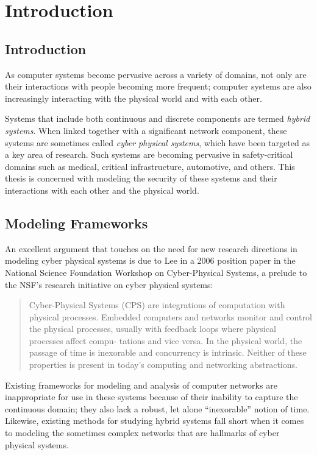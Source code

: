 \chapter{Introduction}
\section{Introduction}
As computer systems become pervasive across a variety of domains, not only are their interactions
with people becoming more frequent; computer systems are also increasingly interacting with the 
physical world and with each other.

Systems that include both continuous and discrete components are termed \emph{hybrid systems}.
When linked together with a significant network component, these systems are sometimes called
\emph{cyber physical systems}, which have been targeted as a key area of research. Such systems
are becoming pervasive in safety-critical domains such as medical, critical infrastructure, 
automotive, and others. This thesis is concerned with modeling the security of these systems and
their interactions with each other and the physical world.
\section{Modeling Frameworks}
An excellent argument that touches on the need for new research directions in modeling cyber physical systems
is due to Lee in a 2006 position paper in the National Science Foundation Workshop on Cyber-Physical Systems,
a prelude to the NSF's research initiative on cyber physical systems:
\begin{quote}
Cyber-Physical Systems (CPS) are integrations of computation with physical
processes. Embedded computers and networks monitor and control the physical
processes, usually with feedback loops where physical processes affect compu-
tations and vice versa. In the physical world, the passage of time is inexorable
and concurrency is intrinsic. Neither of these properties is present in today's
computing and networking abstractions. ~\cite{lee2006cyber}
\end{quote}

Existing frameworks for modeling and analysis of computer networks are inappropriate for use in
these systems because of their inability to capture the continuous domain; they
also lack a robust, let alone ``inexorable'' notion of time. Likewise, existing
methods for studying hybrid systems fall short when it comes to modeling the sometimes complex
networks that are hallmarks of cyber physical systems.
